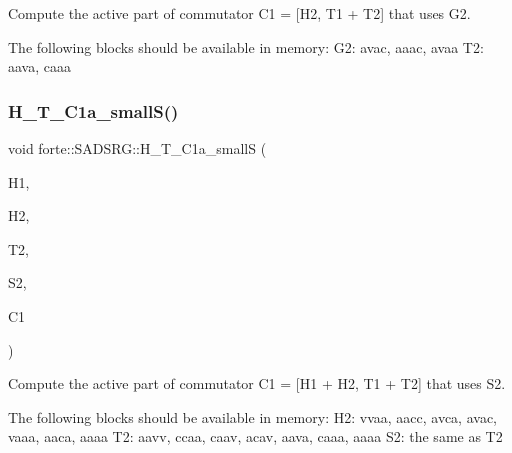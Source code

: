 Compute the active part of commutator C1 = \mbox{[}H2, T1 + T2\mbox{]} that uses G2. 

The following blocks should be available in memory\+: G2\+: avac, aaac, avaa T2\+: aava, caaa\mbox{\label{classforte_1_1_s_a_d_s_r_g_acb9522a430314033b70982dd58dd2c1d}} 
\subsubsection{\texorpdfstring{H\+\_\+\+T\+\_\+\+C1a\+\_\+small\+S()}{H\_T\_C1a\_smallS()}}
{\footnotesize\ttfamily void forte\+::\+S\+A\+D\+S\+R\+G\+::\+H\+\_\+\+T\+\_\+\+C1a\+\_\+smallS (\begin{DoxyParamCaption}\item[{Blocked\+Tensor \&}]{H1,  }\item[{Blocked\+Tensor \&}]{H2,  }\item[{Blocked\+Tensor \&}]{T2,  }\item[{Blocked\+Tensor \&}]{S2,  }\item[{Blocked\+Tensor \&}]{C1 }\end{DoxyParamCaption})\hspace{0.3cm}{\ttfamily [protected]}}



Compute the active part of commutator C1 = \mbox{[}H1 + H2, T1 + T2\mbox{]} that uses S2. 

The following blocks should be available in memory\+: H2\+: vvaa, aacc, avca, avac, vaaa, aaca, aaaa T2\+: aavv, ccaa, caav, acav, aava, caaa, aaaa S2\+: the same as T2\mbox{\label{classforte_1_1_s_a_d_s_r_g_aafcfed4ad03eab60fdf4e366a2ffcd73}} 
